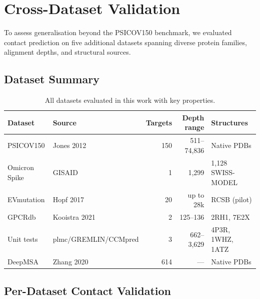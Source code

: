 \section{Cross-Dataset Validation}
\label{sec:cross-dataset}

To assess generalisation beyond the PSICOV150 benchmark, we evaluated contact
prediction on five additional datasets spanning diverse protein families,
alignment depths, and structural sources.

\subsection{Dataset Summary}

\begin{table}[ht]
	\centering
	\caption{All datasets evaluated in this work with key properties.}
	\label{tab:datasets}
	\begin{tabular}{llrrl}
		\toprule
		Dataset       & Source               & Targets & Depth range   & Structures          \\
		\midrule
		PSICOV150     & Jones 2012           & 150     & 511--74{,}836 & Native PDBs         \\
		Omicron Spike & GISAID               & 1       & 1{,}299       & 1{,}128 SWISS-MODEL \\
		EVmutation    & Hopf 2017            & 20      & up to 28k     & RCSB (pilot)        \\
		GPCRdb        & Kooistra 2021        & 2       & 125--136      & 2RH1, 7E2X          \\
		Unit tests    & plmc/GREMLIN/CCMpred & 3       & 662--3{,}629  & 4P3R, 1WHZ, 1ATZ    \\
		DeepMSA       & Zhang 2020           & 614     & ---           & Native PDBs         \\
		\bottomrule
	\end{tabular}
\end{table}

\subsection{Per-Dataset Contact Validation}


